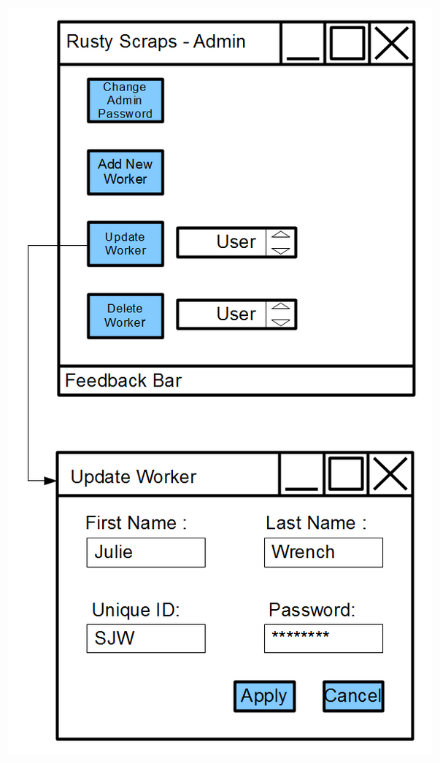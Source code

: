 \begin{figure}[H]
    \includegraphics[width=\textwidth]{./Design/Images/UpdateWorker.png}
\end{figure}

